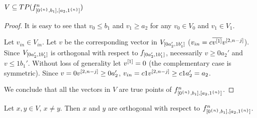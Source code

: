 \begin{lemma}
$V \subseteq TP(f^{n}_{[0^{\{n\}}, b_1], [a_2, 1^{\{n\}}]})$
\end{lemma}

\begin{proof}
It is easy to see that $v_0 \leq b_1$ and $v_1 \geq a_2$
for any $v_0 \in V_0$ and $v_1 \in V_1$.

Let $v_{in} \in V_{in}$.
Let $v$ be the corresponding vector
in $V_{[0 a_2', 1 b_1']}$
($v_{in} = c \overline{v^{[1]}} v^{[2, n-j]}$).
Since $V_{[0 a_2', 1 b_1']}$
is orthogonal with respect to
$f_{[0 a_2', 1 b_1']}$,
necessarily $v \geq 0 a_2'$ and $v \leq 1 b_1'$.
Without loss of generality let $v^{[1]} = 0$
(the complementary case is symmetric).
Since $v = 0 v^{[2, n-j]} \geq 0 a_2'$,
$v_{in} = c 1 v^{[2, n-j]}
\geq c 1 a_2' = a_2$.

We conclude that all the vectors in $V$
are true points of $f^{n}_{[0^{\{n\}}, b_1], [a_2, 1^{\{n\}}]}$.
\end{proof}

\begin{lemma}
Let $x, y \in V$, $x \neq y$.
Then $x$ and $y$ are orthogonal with respect to $f^{n}_{[0^{\{n\}}, b_1], [a_2, 1^{\{n\}}]}$.
\end{lemma}

